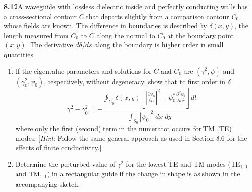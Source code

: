 \par\bigskip
\noindent\textbf{8.12}\quad A waveguide with lossless dielectric inside and perfectly conducting walls has a cross-sectional contour $C$ that departs slightly from a comparison contour $C_{0}$ whose fields are known. The difference in boundaries is described by $\delta(x,y)$, the length measured from $C_{0}$ to $C$ along the normal to $C_{0}$ at the boundary point $(x,y)$. The derivative $d\delta/ds$ along the boundary is higher order in small quantities.
\begin{enumerate}
\item[(a)] If the eigenvalue parameters and solutions for $C$ and $C_{0}$ are $(\gamma^{2},\psi)$ and $(\gamma_{0}^{2},\psi_{0})$, respectively, without degeneracy, show that to first order in $\delta$
\[
\gamma^{2}-\gamma_{0}^{2}=-\frac{\displaystyle\oint_{C_{0}}\delta(x,y)\!\left[\left|\frac{\partial\psi_{0}}{\partial n}\right|^{2}-\psi_{0}^{*}\frac{\partial^{2}\psi_{0}}{\partial n^{2}}\right]dl}{\displaystyle\int_{S_{0}}|\psi_{0}|^{2}\;dx\;dy}
\]
where only the first (second) term in the numerator occurs for TM (TE) modes. [\emph{Hint}: Follow the same general approach as used in Section 8.6 for the effects of finite conductivity.]
\item[(b)] Determine the perturbed value of $\gamma^{2}$ for the lowest TE and TM modes ($\mathrm{TE}_{1,0}$ and $\mathrm{TM}_{1,1}$) in a rectangular guide if the change in shape is as shown in the accompanying sketch.
\end{enumerate}

\begin{center}
\end{center}
\solution

